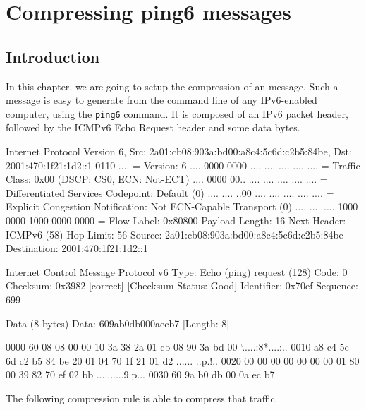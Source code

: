 
\chapter{Compressing ping6 messages}

\section{Introduction}

In this chapter, we are going to setup the compression of an  message. Such a message is easy to generate from the command line of any IPv6-enabled computer, using the \texttt{ping6} command. It is composed of an IPv6 packet header, followed by the ICMPv6 Echo Request header and some data bytes.

\begin{termc}[backgroundcolor=\color{gray!10}, basicstyle=\ttfamily\tiny, escapechar=@]
Internet Protocol Version 6, Src: 2a01:cb08:903a:bd00:a8c4:5c6d:c2b5:84be, Dst: 
2001:470:1f21:1d2::1
    0110 .... = Version: 6
    .... 0000 0000 .... .... .... .... .... = Traffic Class: 0x00 (DSCP: CS0, ECN: Not-ECT)
        .... 0000 00.. .... .... .... .... .... = Differentiated Services Codepoint: Default (0)
        .... .... ..00 .... .... .... .... .... = Explicit Congestion Notification: Not ECN-Capable Transport (0)
    .... .... .... 1000 0000 1000 0000 0000 = Flow Label: 0x80800
    Payload Length: 16
    Next Header: ICMPv6 (58)
    Hop Limit: 56
    Source: 2a01:cb08:903a:bd00:a8c4:5c6d:c2b5:84be
    Destination: 2001:470:1f21:1d2::1
    
Internet Control Message Protocol v6
    Type: Echo (ping) request (128)
    Code: 0
    Checksum: 0x3982 [correct]
    [Checksum Status: Good]
    Identifier: 0x70ef
    Sequence: 699

    Data (8 bytes)
        Data: 609ab0db000aecb7
        [Length: 8]

0000  60 08 08 00 00 10 3a 38 2a 01 cb 08 90 3a bd 00   `.....:8*....:..
0010  a8 c4 5c 6d c2 b5 84 be 20 01 04 70 1f 21 01 d2   ..\m.... ..p.!..
0020  00 00 00 00 00 00 00 01 80 00 39 82 70 ef 02 bb   ..........9.p...
0030  60 9a b0 db 00 0a ec b7  
\end{termc}

The following compression rule is able to compress that traffic.


